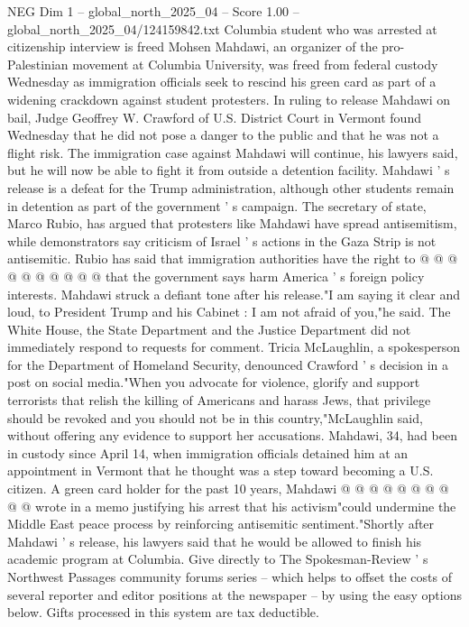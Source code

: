 \begin{textsample}{NEG Dim 1 – global\_north\_2025\_04 – Score 1.00 – global\_north\_2025\_04/124159842.txt}  \label{ex:f1_neg_100}
Columbia student who was arrested at citizenship interview is freed Mohsen Mahdawi, an organizer of the pro-Palestinian movement at Columbia University, was freed from federal custody Wednesday as immigration officials seek to rescind his green card as part of a widening crackdown against student protesters.
In ruling to release Mahdawi on bail, Judge Geoffrey W.
Crawford of U.S.
District Court in Vermont found Wednesday that he did not pose a danger to the public and that he was not a flight risk.
The immigration case against Mahdawi will continue, his lawyers said, but he will now be able to fight it from outside a detention facility.
Mahdawi ' s release is a defeat for the Trump administration, although other students remain in detention as part of the government ' s campaign.
The secretary of state, Marco Rubio, has argued that protesters like Mahdawi have spread antisemitism, while demonstrators say criticism of Israel ' s actions in the Gaza Strip is not antisemitic.
Rubio has said that immigration authorities have the right to @ @ @ @ @ @ @ @ @ @ that the government says harm America ' s foreign policy interests.
Mahdawi struck a defiant tone after his release."I am saying it clear and loud, to President Trump and his Cabinet : I am not afraid of you,"he said.
The White House, the State Department and the Justice Department did not immediately respond to requests for comment.
Tricia McLaughlin, a spokesperson for the Department of Homeland Security, denounced Crawford ' s decision in a post on social media."When you advocate for violence, glorify and support terrorists that relish the killing of Americans and harass Jews, that privilege should be revoked and you should not be in this country,"McLaughlin said, without offering any evidence to support her accusations.
Mahdawi, 34, had been in custody since April 14, when immigration officials detained him at an appointment in Vermont that he thought was a step toward becoming a U.S. citizen.
A green card holder for the past 10 years, Mahdawi @ @ @ @ @ @ @ @ @ @ wrote in a memo justifying his arrest that his activism"could undermine the Middle East peace process by reinforcing antisemitic sentiment."Shortly after Mahdawi ' s release, his lawyers said that he would be allowed to finish his academic program at Columbia.
Give directly to The Spokesman-Review ' s Northwest Passages community forums series -- which helps to offset the costs of several reporter and editor positions at the newspaper -- by using the easy options below.
Gifts processed in this system are tax deductible.

\end{textsample}
